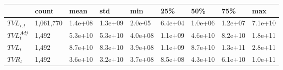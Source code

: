 \begin{tabular}{lllllllll}
\toprule
 & count & mean & std & min & 25\% & 50\% & 75\% & max \\
\midrule
$TVL_{i,t}$ & 1,061,770 & 1.4e+08 & 1.3e+09 & 2.0e-05 & 6.4e+04 & 1.0e+06 & 1.2e+07 & 7.1e+10 \\
$TVL^{Adj}_t$ & 1,492 & 5.3e+10 & 5.3e+10 & 4.0e+08 & 1.1e+09 & 4.6e+10 & 8.2e+10 & 1.8e+11 \\
$TVL_t$ & 1,492 & 8.7e+10 & 8.3e+10 & 3.9e+08 & 1.1e+09 & 8.7e+10 & 1.3e+11 & 2.8e+11 \\
$TVR_t$ & 1,492 & 3.6e+10 & 3.2e+10 & 3.7e+08 & 8.5e+08 & 4.3e+10 & 6.1e+10 & 1.0e+11 \\
\bottomrule
\end{tabular}
